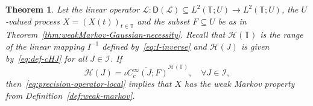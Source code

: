 \documentclass[reqno]{amsart}
\numberwithin{equation}{section}
\newcommand{\bbT}{\mathbb{T}}
\newcommand{\cH}{\mathcal{H}}
\newcommand{\cL}{\mathcal{L}}
\newcommand{\from}{\colon}
\newcommand{\clos}[1]{\overline{ #1 }}
\newcommand{\dom}[1]{\mathsf D(#1)}
\newtheorem{theorem}[lemma]{Theorem}
\theoremstyle{remark}
\theoremstyle{definition}
\begin{document}
\begin{theorem}\label{thm:weakMarkov-Gaussian-sufficiency}
	Let the linear operator $\cL \from \dom{\cL} \subseteq L^2(\bbT; U) \to L^2(\bbT; U)$,
	the $U$-valued process $X = (X(t))_{t\in\bbT}$ and the subset $F \subseteq U$
	be as in Theorem~\ref{thm:weakMarkov-Gaussian-necessity}.
	Recall that $\cH(\bbT)$ is the range of the 
	linear mapping $I^{-1}$ defined by~\eqref{eq:I-inverse}
	and $\cH(J)$ is given by~\eqref{eq:def-cHJ} for all $J \in \mathscr I$.
	If 
	\begin{equation}\label{eq:additional-condition}
		\cH(J) = \clos{\iota C_c^\infty(J; F)}^{\cH(\bbT)}, \quad \forall J \in \mathscr I,
	\end{equation}
	then~\eqref{eq:precision-operator-local} implies that $X$ has the weak Markov property
	from Definition~\ref{def:weak-markov}.
\end{theorem}
%
\end{document}

